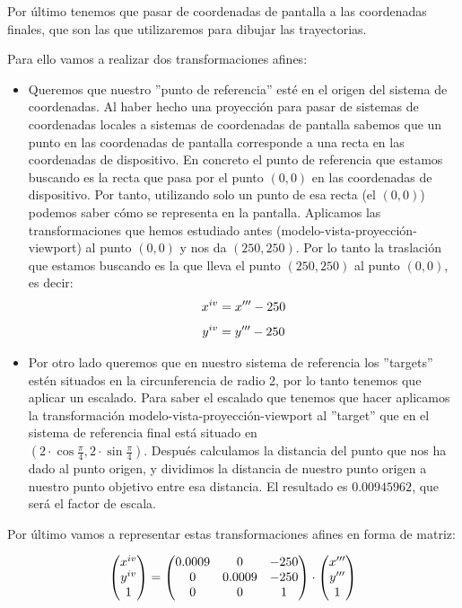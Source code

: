 \documentclass[a4paper,11pt, oneside]{book}
\begin{document}
Por último tenemos que pasar de coordenadas de pantalla a las coordenadas  finales, que son las que utilizaremos para dibujar las trayectorias.

Para ello vamos a realizar dos transformaciones afines:
\begin{itemize}
	\item Queremos que nuestro ''punto de referencia'' esté en el origen del sistema de coordenadas. Al haber hecho una proyección para pasar de sistemas de coordenadas locales a sistemas de coordenadas de pantalla sabemos que un punto en las coordenadas de pantalla corresponde a una recta en las coordenadas de dispositivo. En concreto el punto de referencia que estamos buscando es la recta que pasa por el punto $(0,0)$ en las coordenadas de dispositivo. Por tanto, utilizando solo un punto de esa recta (el $(0,0)$) podemos saber cómo se representa en la pantalla. Aplicamos las transformaciones que hemos estudiado antes (modelo-vista-proyección-viewport) al punto $(0,0)$ y nos da $(250,250)$. Por lo tanto la traslación que estamos buscando es la que lleva el punto $(250,250)$ al punto $(0,0)$, es decir:
	\begin{equation}
	x^{\romannumeral 4} = x'''-250
	\end{equation}
	\begin{equation}
	y^{\romannumeral 4} = y'''-250
	\end{equation}
	\item Por otro lado queremos que en nuestro sistema de referencia los ''targets'' estén situados en la circunferencia de radio 2, por lo tanto tenemos que aplicar un escalado. Para saber el escalado que tenemos que hacer aplicamos la transformación modelo-vista-proyección-viewport al ''target'' que en el sistema de referencia final está situado en  \\
	$(2\cdot \cos\frac{\pi}{4},2\cdot \sin\frac{\pi}{4})$. Después calculamos la distancia del punto que nos ha dado al punto origen, y dividimos la distancia de nuestro punto origen a nuestro punto objetivo entre esa distancia. El resultado es $0.00945962$, que será el factor de escala.
\end{itemize}
Por último vamos a representar estas transformaciones afines en forma de matriz:

\begin{equation}
\begin{pmatrix}
x^{\romannumeral 4}\\
y^{\romannumeral 4}\\
1
\end{pmatrix} =
\begin{pmatrix}
0.0009 &0&-250\\
0&0.0009&-250\\
0&0&1 \\
\end{pmatrix}
\cdot \begin{pmatrix}
x'''\\
y'''\\
1
\end{pmatrix}
\end{equation}
\end{document}
